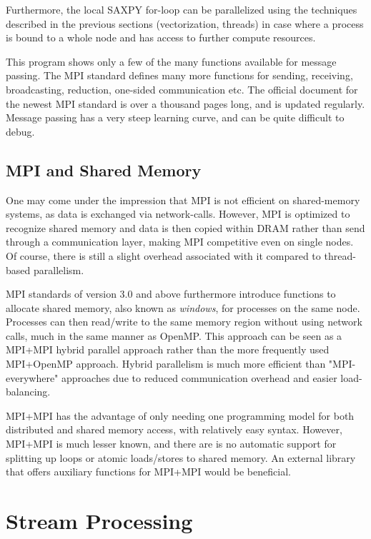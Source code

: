Furthermore, the local SAXPY for-loop can be parallelized using the techniques described in the previous sections (vectorization, threads) in case where a process is bound to a whole node and has access to further compute resources.

This program shows only a few of the many functions available for message passing. The MPI standard defines many more functions for sending, receiving, broadcasting, reduction, one-sided communication etc. The official document for the newest MPI standard \cite{MPI2021} is over a thousand pages long, and is updated regularly. Message passing has a very steep learning curve, and can be quite difficult to debug.  


\subsection{MPI and Shared Memory}

One may come under the impression that MPI is not efficient on shared-memory systems, as data is exchanged via network-calls. However, MPI is optimized to recognize shared memory and data is then copied within DRAM rather than send through a communication layer, making MPI competitive even on single nodes. Of course, there is still a slight overhead associated with it compared to thread-based parallelism.

MPI standards of version 3.0 and above furthermore introduce functions to allocate shared memory, also known as \emph{windows}, for processes on the same node. Processes can then read/write to the same memory region without using network calls, much in the same manner as OpenMP. This approach can be seen as a MPI+MPI hybrid parallel approach rather than the more frequently used MPI+OpenMP approach. Hybrid parallelism is much more efficient than "MPI-everywhere" approaches due to reduced communication overhead and easier load-balancing. 

MPI+MPI has the advantage of only needing one programming model for both distributed and shared memory access, with relatively easy syntax. However, MPI+MPI is much lesser known, and there are is no automatic support for splitting up loops or atomic loads/stores to shared memory. An external library that offers auxiliary functions for MPI+MPI would be beneficial.

\section{Stream Processing}

